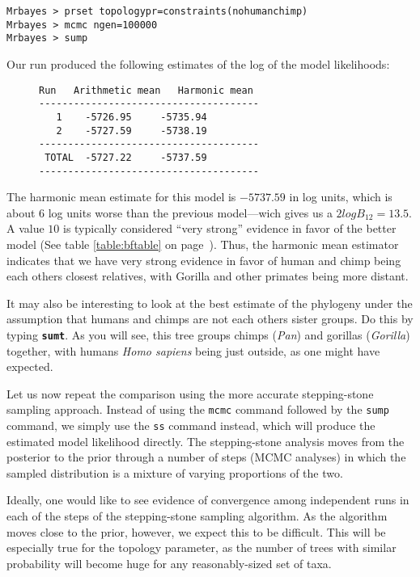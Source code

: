 \documentclass[12pt]{book}
\newcommand{\ttt}[1]{\texttt{#1}}
\newcommand{\tb}[1]{\ttt{\textbf{#1}}}
\begin{document}
\begin{Verbatim}
Mrbayes > prset topologypr=constraints(nohumanchimp)
Mrbayes > mcmc ngen=100000
Mrbayes > sump
\end{Verbatim}

Our run produced the following estimates of the log of the model likelihoods:

\begin{figure}[h]
\centering
\begin{BVerbatim}
Run   Arithmetic mean   Harmonic mean
--------------------------------------
   1    -5726.95     -5735.94
   2    -5727.59     -5738.19
--------------------------------------
 TOTAL  -5727.22     -5737.59
--------------------------------------
\end{BVerbatim}
\end{figure}

The harmonic mean estimate for this model is $-5737.59$ in log units, which is about 6 log units
worse than the previous model---wich gives us a $2logB_{12} = 13.5$. A value $10$ is typically
considered ``very strong'' evidence in favor of the better model  (See table \ref{table:bftable}
on page~\pageref{table:bftable}). Thus, the harmonic mean estimator indicates that we have very
strong evidence in favor of human and chimp being each others closest relatives, with Gorilla
and other primates being more distant.

It may also be interesting to look at the best estimate of the phylogeny under the assumption that
humans and chimps are not each others sister groups. Do this by typing \tb{sumt}. As you will see,
this tree groups chimps (\textit{Pan}) and gorillas (\textit{Gorilla}) together, with humans
\textit{Homo sapiens} being just outside, as one might have expected.

Let us now repeat the comparison using the more accurate stepping-stone sampling approach. Instead
of using the \texttt{mcmc} command followed by the \texttt{sump} command, we simply use the
\texttt{ss} command instead, which will produce the estimated model likelihood directly. The
stepping-stone analysis moves from the posterior to the prior through a number of steps (MCMC
analyses) in which the sampled distribution is a mixture of varying proportions of the two.

Ideally, one would like to see evidence of convergence among independent runs in each of the steps
of the stepping-stone sampling algorithm. As the algorithm moves close to the prior, however, we
expect this to be difficult. This will be especially true for the topology parameter, as the number
of trees with similar probability will become huge for any reasonably-sized set of taxa.
\end{document}
